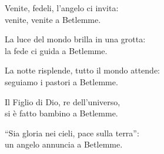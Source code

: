 
\strofa Venite, fedeli, l'angelo ci invita:\\
venite, venite a Betlemme.

\spazio


\spazio

\strofa La luce del mondo brilla in una grotta:\\
la fede ci guida a Betlemme.

\spazio


\spazio

\strofa La notte risplende, tutto il mondo attende:\\
seguiamo i pastori a Betlemme.

\spazio


\spazio

\strofa Il Figlio di Dio, re dell'universo,\\
si è fatto bambino a Betlemme.

\spazio


\spazio

\strofa ``Sia gloria nei cieli, pace sulla terra'':\\
un angelo annuncia a Betlemme.

\spazio

